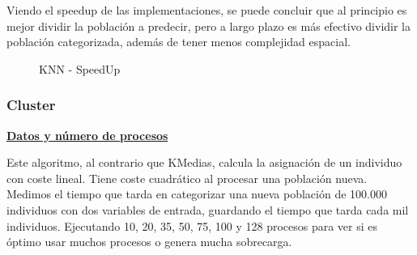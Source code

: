 			Viendo el speedup de las implementaciones, se puede concluir que al principio es mejor dividir la población a predecir, pero a largo plazo es más efectivo dividir la población categorizada, además de tener menos complejidad espacial. 
		
			\begin{figure} [!h]
				\centering
				\caption{KNN - SpeedUp}
			\end{figure}
			
			\newpage
		
		\subsubsection{Cluster}
		
			\begin{flushleft}
			\begin{mdframed}[roundcorner=5pt]			
				\textbf{\underline{Datos y número de procesos}}
				\vspace{0.1cm}
				
				\scriptsize	
				Este algoritmo, al contrario que KMedias, calcula la asignación de un individuo con coste lineal. Tiene coste cuadrático al procesar una población nueva. Medimos el tiempo que tarda en categorizar una nueva población de 100.000 individuos con dos variables de entrada, guardando el tiempo que tarda cada mil individuos. Ejecutando 10, 20, 35, 50, 75, 100 y 128 procesos para ver si es óptimo usar muchos procesos o genera mucha sobrecarga.
			\end{mdframed}
			\end{flushleft}	

